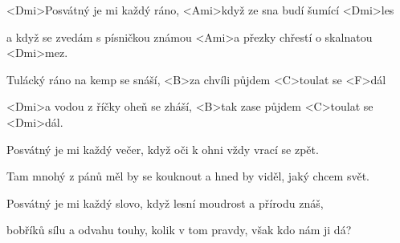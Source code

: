 

\zs
<Dmi>Posvátný je mi každý ráno,
<Ami>když ze sna budí šumící <Dmi>les

a když se zvedám s písničkou známou
<Ami>a přezky chřestí o skalnatou <Dmi>mez.
\ks

\zr
Tulácký ráno na kemp se snáší,
<B>za chvíli půjdem <C>toulat se <F>dál

<Dmi>a vodou z říčky oheň se zháší,
<B>tak zase půjdem <C>toulat se <Dmi>dál.
\kr

\zs
Posvátný je mi každý večer,
když oči k ohni vždy vrací se zpět.

Tam mnohý z pánů měl by se kouknout
a hned by viděl, jaký chcem svět.
\ks

\zr \kr

\zs
Posvátný je mi každý slovo,
když lesní moudrost a přírodu znáš,

bobříků sílu a odvahu touhy,
kolik v tom pravdy, však kdo nám ji dá?
\ks

\zr \kr

\kp
